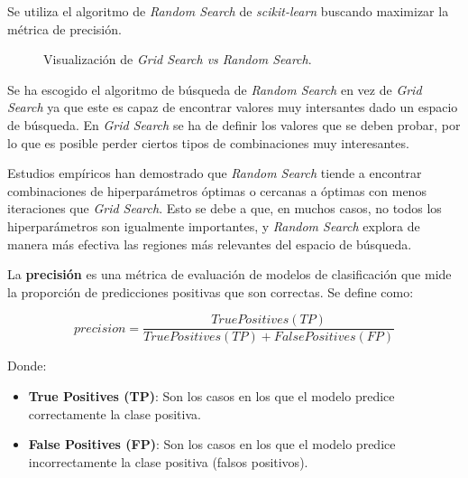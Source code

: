 \documentclass[12pt,letterpaper]{article}
\begin{document}
Se utiliza el algoritmo de \textit{Random Search} de \textit{scikit-learn} buscando maximizar la métrica de precisión.

\begin{figure}[htp]
    \centering
    \caption{Visualización de \textit{Grid Search vs Random Search}.}
    \label{fig:grid_vs_rando}
\end{figure}

Se ha escogido el algoritmo de búsqueda de \textit{Random Search} en vez de \textit{Grid Search} ya que este es capaz de encontrar valores muy intersantes dado un espacio de búsqueda. En \textit{Grid Search} se ha de definir los valores que se deben probar, por lo que es posible perder ciertos tipos de combinaciones muy interesantes.

Estudios empíricos han demostrado que \textit{Random Search} tiende a encontrar combinaciones de hiperparámetros óptimas o cercanas a óptimas con menos iteraciones que \textit{Grid Search}. Esto se debe a que, en muchos casos, no todos los hiperparámetros son igualmente importantes, y \textit{Random Search} explora de manera más efectiva las regiones más relevantes del espacio de búsqueda.

La \textbf{precisión} es una métrica de evaluación de modelos de clasificación que mide la proporción de predicciones positivas que son correctas. Se define como:

\begin{equation}
    precision = \frac{True Positives (TP)}{True Positives (TP) + False Positives (FP)}
\end{equation}

Donde:
\begin{itemize}
    \item \textbf{True Positives (TP)}: Son los casos en los que el modelo predice correctamente la clase positiva.
    \item \textbf{False Positives (FP)}: Son los casos en los que el modelo predice incorrectamente la clase positiva (falsos positivos).
\end{itemize}
\end{document}
